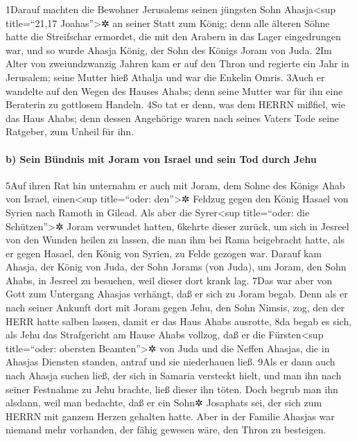 1Darauf machten die Bewohner Jerusalems seinen jüngsten Sohn
Ahasja\textless sup title=``21,17 Joahas''\textgreater✲ an seiner Statt
zum König; denn alle älteren Söhne hatte die Streifschar ermordet, die
mit den Arabern in das Lager eingedrungen war, und so wurde Ahasja
König, der Sohn des Königs Joram von Juda. 2Im Alter von zweiundzwanzig
Jahren kam er auf den Thron und regierte ein Jahr in Jerusalem; seine
Mutter hieß Athalja und war die Enkelin Omris. 3Auch er wandelte auf den
Wegen des Hauses Ahabs; denn seine Mutter war für ihn eine Beraterin zu
gottlosem Handeln. 4So tat er denn, was dem HERRN mißfiel, wie das Haus
Ahabs; denn dessen Angehörige waren nach seines Vaters Tode seine
Ratgeber, zum Unheil für ihn.

\hypertarget{b-sein-buxfcndnis-mit-joram-von-israel-und-sein-tod-durch-jehu}{%
\paragraph{b) Sein Bündnis mit Joram von Israel und sein Tod durch
Jehu}\label{b-sein-buxfcndnis-mit-joram-von-israel-und-sein-tod-durch-jehu}}

5Auf ihren Rat hin unternahm er auch mit Joram, dem Sohne des Königs
Ahab von Israel, einen\textless sup title=``oder: den''\textgreater✲
Feldzug gegen den König Hasael von Syrien nach Ramoth in Gilead. Als
aber die Syrer\textless sup title=``oder: die Schützen''\textgreater✲
Joram verwundet hatten, 6kehrte dieser zurück, um sich in Jesreel von
den Wunden heilen zu lassen, die man ihm bei Rama beigebracht hatte, als
er gegen Hasael, den König von Syrien, zu Felde gezogen war. Darauf kam
Ahasja, der König von Juda, der Sohn Jorams (von Juda), um Joram, den
Sohn Ahabs, in Jesreel zu besuchen, weil dieser dort krank lag. 7Das war
aber von Gott zum Untergang Ahasjas verhängt, daß er sich zu Joram
begab. Denn als er nach seiner Ankunft dort mit Joram gegen Jehu, den
Sohn Nimsis, zog, den der HERR hatte salben lassen, damit er das Haus
Ahabs ausrotte, 8da begab es sich, als Jehu das Strafgericht am Hause
Ahabs vollzog, daß er die Fürsten\textless sup title=``oder: obersten
Beamten''\textgreater✲ von Juda und die Neffen Ahasjas, die in Ahasjas
Diensten standen, antraf und sie niederhauen ließ. 9Als er dann auch
nach Ahasja suchen ließ, der sich in Samaria versteckt hielt, und man
ihn nach seiner Festnahme zu Jehu brachte, ließ dieser ihn töten. Doch
begrub man ihn alsdann, weil man bedachte, daß er ein Sohn✲ Josaphats
sei, der sich zum HERRN mit ganzem Herzen gehalten hatte. Aber in der
Familie Ahasjas war niemand mehr vorhanden, der fähig gewesen wäre, den
Thron zu besteigen.

